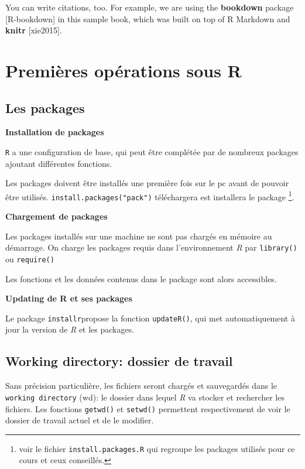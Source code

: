 \documentclass[]{book}
\let\rmarkdownfootnote\footnote%
\def\footnote{\protect\rmarkdownfootnote}
\begin{document}
You can write citations, too. For example, we are using the \textbf{bookdown} package {[}R-bookdown{]} in this sample book, which was built on top of R Markdown and \textbf{knitr} {[}xie2015{]}.

\hypertarget{premieres-operations-sous-r}{%
\chapter{Premières opérations sous R}\label{premieres-operations-sous-r}}

\hypertarget{les-packages}{%
\section{Les packages}\label{les-packages}}

\textbf{Installation de packages}

\texttt{R} a une configuration de base, qui peut être complétée par de nombreux packages ajoutant différentes fonctions.

Les packages doivent être installés une première fois sur le pc avant de pouvoir être utilisés. \texttt{install.packages("pack")} téléchargera est installera le package \footnote{voir le fichier \texttt{install.packages.R} qui regroupe les packages utilisés pour ce cours et ceux conseillés.}.

\textbf{Chargement de packages}

Les packages installés sur une machine ne sont pas chargés en mémoire au démarrage. On charge les packages requis dans l'environnement \emph{R} par \texttt{library()} ou \texttt{require()}

Les fonctions et les données contenus dans le package sont alors accessibles.

\textbf{Updating de R et ses packages}

Le package \texttt{installr}propose la fonction \texttt{updateR()}, qui met automatiquement à jour la version de \emph{R} et les packages.

\hypertarget{working-directory-dossier-de-travail}{%
\section{Working directory: dossier de travail}\label{working-directory-dossier-de-travail}}

Sans précision particulière, les fichiers seront chargés et sauvegardés dans le \texttt{working\ directory} (wd): le dossier dans lequel \emph{R} va stocker et rechercher les fichiers. Les fonctions \texttt{getwd()} et \texttt{setwd()} permettent respectivement de voir le dossier de travail actuel et de le modifier.
\end{document}
